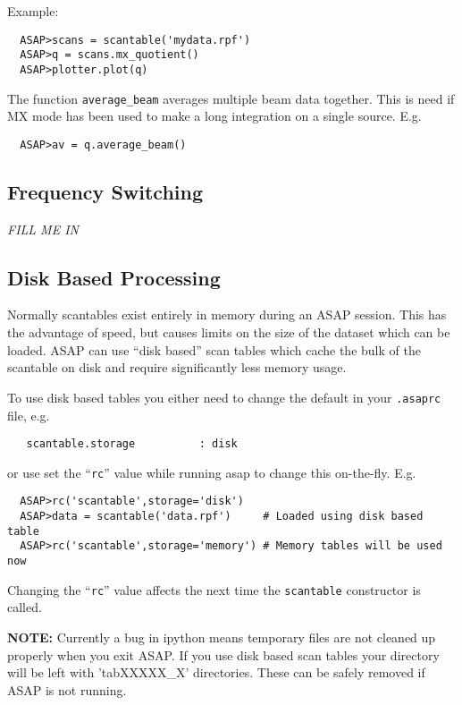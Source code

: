 \documentclass[11pt]{article}
\newcommand{\cmd}[1]{{\tt #1}}
\begin{document}
Example:

\begin{verbatim}
  ASAP>scans = scantable('mydata.rpf')
  ASAP>q = scans.mx_quotient()
  ASAP>plotter.plot(q)
\end{verbatim}

The function \cmd{average\_beam} averages multiple beam data
together. This is need if MX mode has been used to make a long
integration on a single source. E.g.

\begin{verbatim}
  ASAP>av = q.average_beam()
\end{verbatim}

\subsection{Frequency Switching}

{\em FILL ME IN}

\subsection{Disk Based Processing}

Normally scantables exist entirely in memory during an ASAP
session. This has the advantage of speed, but causes limits on the
size of the dataset which can be loaded. ASAP can use ``disk based''
scan tables which cache the bulk of the scantable on disk and require
significantly less memory usage.

To use disk based tables you either need to change the default in your
\cmd{.asaprc} file, e.g.
\begin{verbatim}
   scantable.storage          : disk
\end{verbatim}

or use set the ``\cmd{rc}'' value while running asap to change this
on-the-fly. E.g.
\begin{verbatim}
  ASAP>rc('scantable',storage='disk')
  ASAP>data = scantable('data.rpf')     # Loaded using disk based table
  ASAP>rc('scantable',storage='memory') # Memory tables will be used now
\end{verbatim}

Changing the ``\cmd{rc}'' value affects the next time the
\cmd{scantable} constructor is called.

{\bf NOTE: } Currently a bug in ipython means temporary files are not
cleaned up properly when you exit ASAP. If you use disk based scan
tables your directory will be left with 'tabXXXXX\_X' directories. These can
be safely removed if ASAP is not running.
\end{document}
